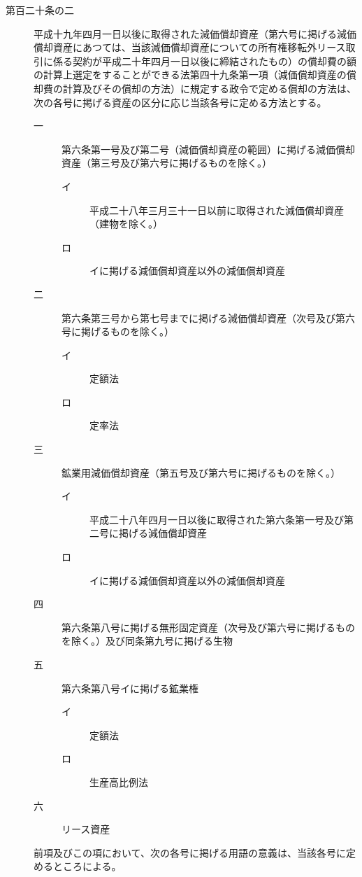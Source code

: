 \documentclass[twocolumn,a4j,10pt]{ltjtarticle}
\begin{document}
\begin{description}
\item[第百二十条の二]平成十九年四月一日以後に取得された減価償却資産（第六号に掲げる減価償却資産にあつては、当該減価償却資産についての所有権移転外リース取引に係る契約が平成二十年四月一日以後に締結されたもの）の償却費の額の計算上選定をすることができる法第四十九条第一項（減価償却資産の償却費の計算及びその償却の方法）に規定する政令で定める償却の方法は、次の各号に掲げる資産の区分に応じ当該各号に定める方法とする。
\begin{description}
\item[一]第六条第一号及び第二号（減価償却資産の範囲）に掲げる減価償却資産（第三号及び第六号に掲げるものを除く。）
\begin{description}
\item[イ]平成二十八年三月三十一日以前に取得された減価償却資産（建物を除く。）
\item[ロ]イに掲げる減価償却資産以外の減価償却資産
\end{description}
\item[二]第六条第三号から第七号までに掲げる減価償却資産（次号及び第六号に掲げるものを除く。）
\begin{description}
\item[イ]定額法
\item[ロ]定率法
\end{description}
\item[三]鉱業用減価償却資産（第五号及び第六号に掲げるものを除く。）
\begin{description}
\item[イ]平成二十八年四月一日以後に取得された第六条第一号及び第二号に掲げる減価償却資産
\item[ロ]イに掲げる減価償却資産以外の減価償却資産
\end{description}
\item[四]第六条第八号に掲げる無形固定資産（次号及び第六号に掲げるものを除く。）及び同条第九号に掲げる生物
\item[五]第六条第八号イに掲げる鉱業権
\begin{description}
\item[イ]定額法
\item[ロ]生産高比例法
\end{description}
\item[六]リース資産
\end{description}
\item[]前項及びこの項において、次の各号に掲げる用語の意義は、当該各号に定めるところによる。
\begin{description}

\end{description}
\end{description}
\end{document}
